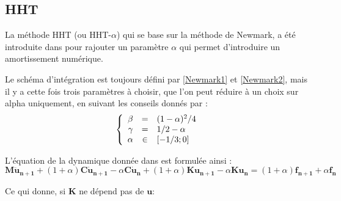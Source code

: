\documentclass[12pt,a4paper]{report}
\begin{document}
\subsection{HHT}

La méthode HHT (ou HHT-$\alpha$) qui se base sur la méthode de Newmark, a été introduite dans \cite{HHT2} pour rajouter un paramètre $\alpha$ qui permet d'introduire un amortissement numérique.

\noindent
Le schéma d'intégration est toujours défini par \ref{Newmark1} et \ref{Newmark2}, mais il y a cette fois trois paramètres à choisir, que l'on peut réduire à un choix sur alpha uniquement, en suivant les conseils donnés par \cite{HHT2} :
\begin{equation}
	\left\{
		\begin{array}{r c l}
			\beta &=& ( 1- \alpha )^{2}/4
			\\
			\gamma &=& 1/2 - \alpha
			\\
			\alpha &\in& [-1/3;0]
		\end{array}
	\right.
\end{equation}

\noindent
L'équation de la dynamique donnée dans \cite{HHT} est formulée ainsi :
\begin{equation}
	\mathbf{M}{\mathbf{\ddot{u}_{n+1}}} 
	+ (1+\alpha)\mathbf{C}{\mathbf{\dot{u}_{n+1}}}
	- \alpha \mathbf{C}{\mathbf{\dot{u}_n}}
	+ (1+\alpha) \mathbf{K} \mathbf{u_{n+1}}
	- \alpha \mathbf{K} \mathbf{u_n}
	= (1+\alpha)\mathbf{f_{n+1}}  + \alpha \mathbf{f_n}
\end{equation}

\noindent
Ce qui donne, si $\mathbf{K}$ ne dépend pas de $\mathbf{u}$:
\end{document}
